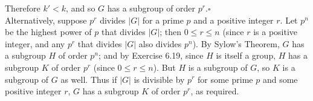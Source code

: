 \documentclass{homework}
\begin{document}
\begin{solution}
  Therefore $k'<k$, and so $G$ has a subgroup of order $p^r$.\hfill$\square$\\

  Alternatively, suppose $p^r$ divides $\left| G \right| $ for a prime $p$ and a positive
  integer $r$. Let $p^n$ be the highest power of $p$ that divides $\left| G \right| $; then $0\le
  r\le n$ (since $r$ is a positive integer, and any $p^r$ that divides $\left| G \right| $ also
  divides $p^n$). By Sylow's Theorem, $G$ has a subgroup $H$ of order $p^n$; and by Exercise 6.19,
  since $H$ is itself a group, $H$ has a subgroup $K$ of order $p^r$ (since $0\le r\le n$). But $H$
  is a subgroup of $G$, so $K$ is a subgroup of $G$ as well. Thus if $\left| G \right|$ is divisible
  by $p^r$ for some prime $p$ and some positive integer $r$, $G$ has a subgroup $K$ of order $p^r$,
  as required.
  
\end{solution}
\end{document}
